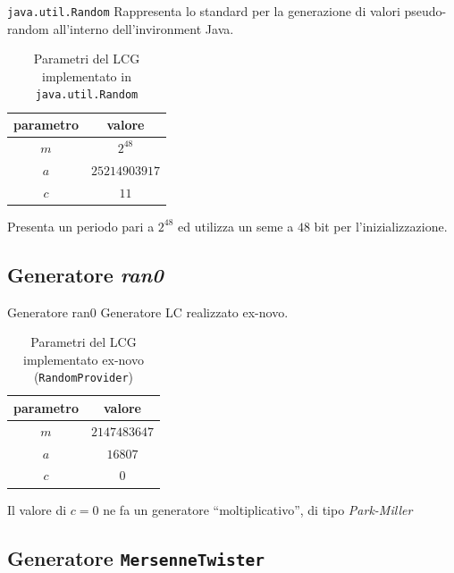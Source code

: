 \documentclass[slidestop,compress,mathserif]{beamer}
\begin{document}
\begin{frame}{\tt java.util.Random}
Rappresenta lo standard per la generazione di valori pseudo-random all'interno dell'invironment Java.
\begin{table}[!h]
	\begin{center}
	\begin{tabular}{c|c}
	parametro & valore\\
	\hline
	$m$ & $2^{48}$  \\
	$a$ & $25214903917$  \\
	$c$ & $11$  \\
	\end{tabular}
	\end{center}
	\caption{Parametri del LCG implementato in {\tt java.util.Random}}
	\label{tab:rndjava}
\end{table}
Presenta un periodo pari a $2^{48}$ ed utilizza un seme a $48$ bit per l'inizializzazione.
\end{frame}

\subsection{Generatore {\it ran0}}
\begin{frame}{Generatore ran0}
Generatore LC realizzato ex-novo.
\begin{table}[!h]
	\begin{center}
	\begin{tabular}{c|c}
	parametro & valore\\
	\hline
	$m$ & $2147483647$  \\
	$a$ & $16807$  \\
	$c$ & $0$  \\
	\end{tabular}
	\end{center}
	\caption{Parametri del LCG implementato ex-novo ({\tt RandomProvider})}
	\label{tab:rndcustom}
\end{table}
Il valore di $c=0$ ne fa un generatore ``moltiplicativo'', di tipo {\em Park-Miller}
\end{frame}

\subsection{Generatore {\tt MersenneTwister}}
\end{document}
